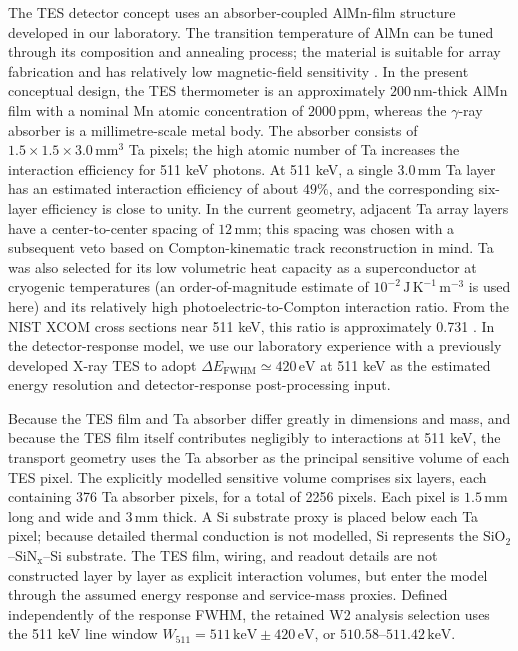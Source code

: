 \documentclass[11pt]{article}
\begin{document}
The TES detector concept uses an absorber-coupled AlMn-film structure developed
in our laboratory. The transition temperature of AlMn can be tuned through its
composition and annealing process; the material is suitable for array fabrication
and has relatively low magnetic-field sensitivity
\cite{Xie2026AlMn,Vavagiakis2017AlMnMagnetic}. In the present conceptual design,
the TES thermometer is an approximately $200\,\mathrm{nm}$-thick AlMn film with
a nominal Mn atomic concentration of $2000\,\mathrm{ppm}$, whereas the $\gamma$-ray absorber is a
millimetre-scale metal body. The absorber consists of
$1.5\times1.5\times3.0\,\mathrm{mm^3}$ Ta pixels; the high atomic number of Ta
increases the interaction efficiency for 511 keV photons. At 511 keV, a single
$3.0\,\mathrm{mm}$ Ta layer has an estimated interaction efficiency of about
$49\%$, and the corresponding six-layer efficiency is close to unity. In the
current geometry, adjacent Ta array layers have a center-to-center spacing of
$12\,\mathrm{mm}$; this spacing was chosen with a subsequent veto based on
Compton-kinematic track reconstruction in mind. Ta was also selected for its low
volumetric heat capacity as a superconductor at cryogenic temperatures (an
order-of-magnitude estimate of $10^{-2}\,\mathrm{J\,K^{-1}\,m^{-3}}$ is used
here) and its relatively high photoelectric-to-Compton interaction ratio. From
the NIST XCOM cross sections near 511 keV, this ratio is approximately 0.731
\cite{NISTXCOM}. In the detector-response model, we use our laboratory experience
with a previously developed X-ray TES \cite{Xie2026AlMn} to adopt
$\Delta E_{\mathrm{FWHM}}\simeq420\,\mathrm{eV}$ at 511 keV as the estimated
energy resolution and detector-response post-processing input.

Because the TES film and Ta absorber differ greatly in dimensions and mass, and
because the TES film itself contributes negligibly to interactions at 511 keV,
the transport geometry uses the Ta absorber as the principal sensitive volume of
each TES pixel. The explicitly modelled sensitive volume comprises six layers,
each containing 376 Ta absorber pixels, for a total of 2256 pixels. Each pixel is
$1.5\,\mathrm{mm}$ long and wide and $3\,\mathrm{mm}$ thick. A Si substrate proxy
is placed below each Ta pixel; because detailed thermal conduction is not modelled,
Si represents the $\mathrm{SiO_2}$--$\mathrm{SiN_x}$--Si substrate. The TES film,
wiring, and readout details are not constructed layer by layer as explicit
interaction volumes, but enter the model through the assumed energy response and
service-mass proxies. Defined independently of the response FWHM, the retained W2
analysis selection uses the 511 keV line window
$W_{511}=511\,\mathrm{keV}\pm420\,\mathrm{eV}$, or
$510.58$--$511.42\,\mathrm{keV}$.
\end{document}

